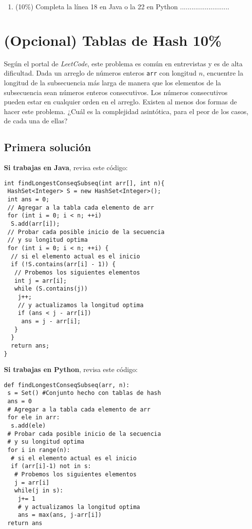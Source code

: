 \documentclass[10 pt]{article}
\begin{document}
\begin{multicols}{2}
\begin{enumerate}[label=\Alph*]
  \item (10\%) Completa la línea 18 en Java o la 22 en Python ..........................

\end{enumerate}

\section{(Opcional) Tablas de Hash 10\%}
Según el portal de \textit{LeetCode}, este problema es común en entrevistas y es de alta dificultad. 
Dada un arreglo de números enteros \texttt{arr} con longitud $n$, encuentre la longitud de la subsecuencia más larga de manera que los elementos de la subsecuencia sean números enteros consecutivos. Los números consecutivos pueden estar en cualquier orden en el arreglo. Existen al menos dos formas de hacer este problema. ¿Cuál es la complejidad asintótica, para el peor de los casos, de cada una de ellas?

\subsection{Primera solución}

\textbf{Si trabajas en Java}, revisa este código:

{\footnotesize
\begin{lstlisting}
int findLongestConseqSubseq(int arr[], int n){
 HashSet<Integer> S = new HashSet<Integer>();
 int ans = 0;
 // Agregar a la tabla cada elemento de arr
 for (int i = 0; i < n; ++i)
  S.add(arr[i]);
 // Probar cada posible inicio de la secuencia
 // y su longitud optima
 for (int i = 0; i < n; ++i) {
  // si el elemento actual es el inicio
  if (!S.contains(arr[i] - 1)) {
   // Probemos los siguientes elementos          
   int j = arr[i];
   while (S.contains(j))
    j++;
    // y actualizamos la longitud optima                
    if (ans < j - arr[i])
     ans = j - arr[i];
   }
  }
  return ans;
}
\end{lstlisting}
}

\textbf{Si trabajas en Python}, revisa este código:

{\footnotesize
\begin{lstlisting}
def findLongestConseqSubseq(arr, n):
 s = Set() #Conjunto hecho con tablas de hash
 ans = 0
 # Agregar a la tabla cada elemento de arr
 for ele in arr:
  s.add(ele)
 # Probar cada posible inicio de la secuencia
 # y su longitud optima
 for i in range(n):
  # si el elemento actual es el inicio
  if (arr[i]-1) not in s:
   # Probemos los siguientes elementos 
   j = arr[i]
   while(j in s):
    j+= 1
    # y actualizamos la longitud optima  
    ans = max(ans, j-arr[i])
 return ans
\end{lstlisting}
}




\end{multicols}
\end{document}
